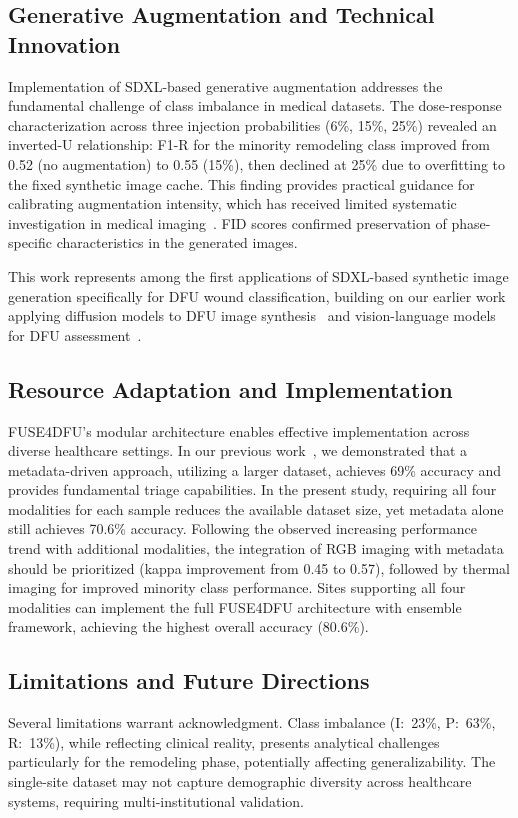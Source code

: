 \documentclass[journal,twoside,web]{ieeecolor}
\begin{document}
\subsection{Generative Augmentation and Technical Innovation}
Implementation of SDXL\nobreakdash-based generative augmentation addresses the fundamental challenge of class imbalance in medical datasets. The dose\nobreakdash-response characterization across three injection probabilities (6\%, 15\%, 25\%) revealed an inverted\nobreakdash-U relationship: F1\nobreakdash-R for the minority remodeling class improved from 0.52 (no augmentation) to 0.55 (15\%), then declined at 25\% due to overfitting to the fixed synthetic image cache. This finding provides practical guidance for calibrating augmentation intensity, which has received limited systematic investigation in medical imaging~\cite{kebaili2023deep}. FID scores confirmed preservation of phase\nobreakdash-specific characteristics in the generated images.

This work represents among the first applications of SDXL\nobreakdash-based synthetic image generation specifically for DFU wound classification, building on our earlier work applying diffusion models to DFU image synthesis~\cite{basiri2025synthesizing} and vision\nobreakdash-language models for DFU assessment~\cite{basiri2025enhancing,basiri2025ulcergpt}.

\subsection{Resource Adaptation and Implementation}
FUSE4DFU's modular architecture enables effective implementation across diverse healthcare settings. In our previous work~\cite{basiri2021reduction}, we demonstrated that a metadata\nobreakdash-driven approach, utilizing a larger dataset, achieves 69\% accuracy and provides fundamental triage capabilities. In the present study, requiring all four modalities for each sample reduces the available dataset size, yet metadata alone still achieves 70.6\% accuracy. Following the observed increasing performance trend with additional modalities, the integration of RGB imaging with metadata should be prioritized (kappa improvement from 0.45 to 0.57), followed by thermal imaging for improved minority class performance. Sites supporting all four modalities can implement the full FUSE4DFU architecture with ensemble framework, achieving the highest overall accuracy (80.6\%).

\subsection{Limitations and Future Directions}
Several limitations warrant acknowledgment. Class imbalance (I:~23\%, P:~63\%, R:~13\%), while reflecting clinical reality, presents analytical challenges particularly for the remodeling phase, potentially affecting generalizability. The single\nobreakdash-site dataset may not capture demographic diversity across healthcare systems, requiring multi\nobreakdash-institutional validation.
\end{document}

